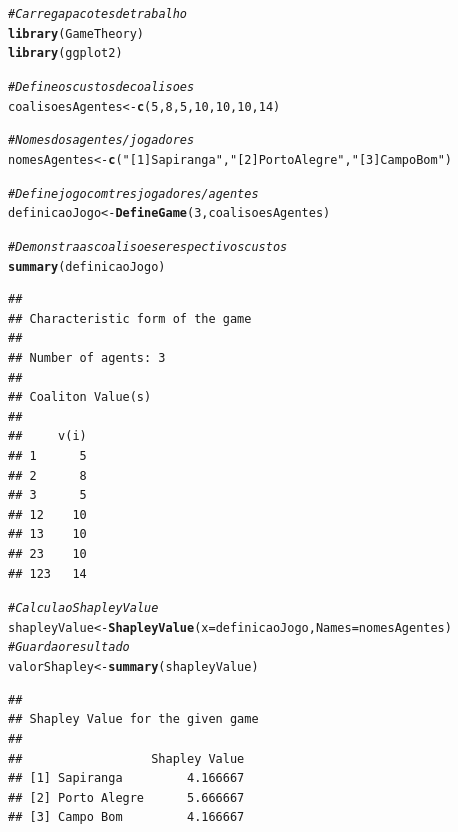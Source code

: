 \documentclass[
	article,			        %
	11pt,				          %
	oneside,			        %
	a4paper,			        %
	english,			        %
	brazil,				        %
	sumario=tradicional
]{abntex2}\usepackage[]{graphicx}\usepackage[]{color}
\makeatletter
\newcommand{\hlnum}[1]{\textcolor[rgb]{0.686,0.059,0.569}{#1}}%
\newcommand{\hlstr}[1]{\textcolor[rgb]{0.192,0.494,0.8}{#1}}%
\newcommand{\hlcom}[1]{\textcolor[rgb]{0.678,0.584,0.686}{\textit{#1}}}%
\newcommand{\hlstd}[1]{\textcolor[rgb]{0.345,0.345,0.345}{#1}}%
\newcommand{\hlkwb}[1]{\textcolor[rgb]{0.69,0.353,0.396}{#1}}%
\newcommand{\hlkwc}[1]{\textcolor[rgb]{0.333,0.667,0.333}{#1}}%
\newcommand{\hlkwd}[1]{\textcolor[rgb]{0.737,0.353,0.396}{\textbf{#1}}}%
\newenvironment{kframe}{%
 \def\at@end@of@kframe{}%
 \ifinner\ifhmode%
  \def\at@end@of@kframe{\end{minipage}}%
  \begin{minipage}{\columnwidth}%
 \fi\fi%
 \def\FrameCommand##1{\hskip\@totalleftmargin \hskip-\fboxsep
 \colorbox{shadecolor}{##1}\hskip-\fboxsep
     \hskip-\linewidth \hskip-\@totalleftmargin \hskip\columnwidth}%
 \MakeFramed {\advance\hsize-\width
   \@totalleftmargin\z@ \linewidth\hsize
   \@setminipage}}%
 {\par\unskip\endMakeFramed%
 \at@end@of@kframe}
\newenvironment{knitrout}{}{} %
\makeatother
\begin{document}
\begin{knitrout}
\color{fgcolor}\begin{kframe}
\begin{alltt}
\hlcom{# Carrega pacotes de trabalho}
\hlkwd{library}\hlstd{(GameTheory)}
\hlkwd{library}\hlstd{(ggplot2)}

\hlcom{# Define os custos de coalisoes}
\hlstd{coalisoesAgentes} \hlkwb{<-} \hlkwd{c}\hlstd{(}\hlnum{5}\hlstd{,} \hlnum{8}\hlstd{,} \hlnum{5}\hlstd{,} \hlnum{10}\hlstd{,} \hlnum{10}\hlstd{,} \hlnum{10}\hlstd{,} \hlnum{14}\hlstd{)}

\hlcom{# Nomes dos agentes/jogadores}
\hlstd{nomesAgentes} \hlkwb{<-} \hlkwd{c}\hlstd{(}\hlstr{"[1] Sapiranga"}\hlstd{,}\hlstr{"[2] Porto Alegre"}\hlstd{,}\hlstr{"[3] Campo Bom"}\hlstd{)}

\hlcom{# Define jogo com tres jogadores/agentes}
\hlstd{definicaoJogo}   \hlkwb{<-} \hlkwd{DefineGame}\hlstd{(}\hlnum{3}\hlstd{, coalisoesAgentes)}

\hlcom{# Demonstra as coalisoes e respectivos custos}
\hlkwd{summary}\hlstd{(definicaoJogo)}
\end{alltt}
\begin{verbatim}
## 
## Characteristic form of the game 
## 
## Number of agents: 3 
## 
## Coaliton Value(s) 
## 
##     v(i)
## 1      5
## 2      8
## 3      5
## 12    10
## 13    10
## 23    10
## 123   14
\end{verbatim}
\begin{alltt}
\hlcom{# Calcula o Shapley Value}
\hlstd{shapleyValue} \hlkwb{<-} \hlkwd{ShapleyValue}\hlstd{(}\hlkwc{x} \hlstd{= definicaoJogo,} \hlkwc{Names} \hlstd{= nomesAgentes)}
\hlcom{# Guarda o resultado}
\hlstd{valorShapley} \hlkwb{<-} \hlkwd{summary}\hlstd{(shapleyValue)}
\end{alltt}
\begin{verbatim}
## 
## Shapley Value for the given game 
## 
##                  Shapley Value
## [1] Sapiranga         4.166667
## [2] Porto Alegre      5.666667
## [3] Campo Bom         4.166667
\end{verbatim}
\end{kframe}
\end{knitrout}
\end{document}
